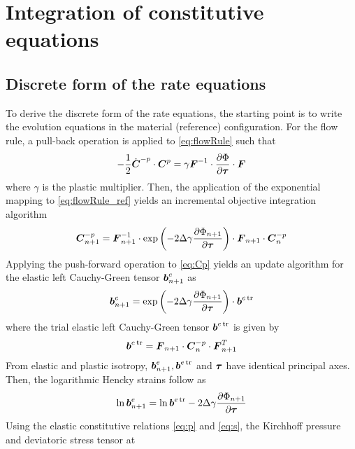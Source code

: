 \section{Integration of constitutive equations} \label{sec:integration}

\subsection{Discrete form of the rate equations}
To derive the discrete form of the rate equations, the starting point 
is to write the evolution equations in the material (reference) 
configuration. For the flow rule, a pull-back operation is applied to 
\eqref{eq:flowRule} such that
%
\begin{equation}\label{eq:flowRule_ref}
-\frac{1}{2}\dot{{\boldsymbol{C}}}^{-p}\cdot{\boldsymbol{C}}^p 
= \gamma{\boldsymbol{F}}^{-1} \cdot \frac{\partial\Phi}{\partial{\boldsymbol{\tau}}} \cdot {\boldsymbol{F}}
\end{equation}
%
where $\gamma$ is the plastic multiplier. Then, the application of the 
exponential mapping to \eqref{eq:flowRule_ref} yields an incremental 
objective integration algorithm
%
\begin{equation}\label{eq:Cp}
{\boldsymbol{C}}_{n+1}^{-p} = {\boldsymbol{F}}_{n+1}^{-1} \cdot \exp\left( -2\Delta\gamma
\frac{\partial\Phi_{n+1}}{\partial{\boldsymbol{\tau}}}\right) \cdot {\boldsymbol{F}}_{n+1} 
\cdot {\boldsymbol{C}}_{n}^{-p}
\end{equation}
%
Applying the push-forward operation to \eqref{eq:Cp} yields an update
algorithm for the elastic left Cauchy-Green tensor ${\boldsymbol{b}}_{n+1}^e$ as
%
\begin{equation}\label{eq:be_n}
{\boldsymbol{b}}_{n+1}^e = \exp\left( -2\Delta\gamma\frac{\partial\Phi_{n+1}}
{\partial{\boldsymbol{\tau}}}\right)\cdot{\boldsymbol{b}}^{e\operatorname{\text{tr}}}
\end{equation}
%
where the trial elastic left Cauchy-Green tensor ${\boldsymbol{b}}^{e\operatorname{\text{tr}}}$ is given 
by
%
\begin{equation}\label{eq:betr}
{\boldsymbol{b}}^{e\operatorname{\text{tr}}} = {\boldsymbol{F}}_{n+1}\cdot{\boldsymbol{C}}_{n}^{-p}\cdot{\boldsymbol{F}}^T_{n+1}
\end{equation}
%
From elastic and plastic isotropy, ${\boldsymbol{b}}_{n+1}^e, {\boldsymbol{b}}^{e\operatorname{\text{tr}}}$ and 
${\boldsymbol{\tau}}$ have identical principal axes. Then, the logarithmic Hencky
strains follow as
%
\begin{equation}\label{eq:lnbetr}
\ln{\boldsymbol{b}}_{n+1}^e = \ln{\boldsymbol{b}}^{e\operatorname{\text{tr}}} - 
2\Delta\gamma\frac{\partial\Phi_{n+1}}{\partial{\boldsymbol{\tau}}}
\end{equation}
%
Using the elastic constitutive relations \eqref{eq:p} and 
\eqref{eq:s}, the Kirchhoff pressure and deviatoric stress tensor at 
